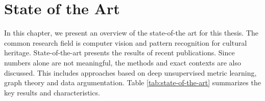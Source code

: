 \chapter{State of the Art}

In this chapter, we present an overview of the state-of-the art for this thesis. The common research field is computer vision and pattern recognition for cultural heritage. State-of-the-art presents the results of recent publications. Since numbers alone are not meaningful, the methods and exact contexts are also discussed. This includes approaches based on deep unsupervised metric learning, graph theory and data argumentation. Table \ref{tab:state-of-the-art} summarizes the key results and characteristics. 

\begin{table}
	\label{tab:state-of-the-art}
\end{table}
